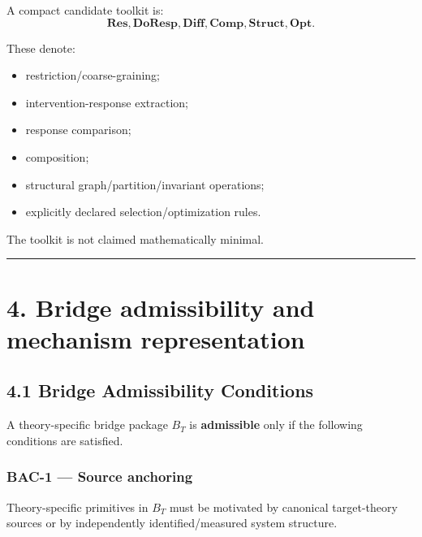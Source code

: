 \documentclass[
  11pt,
  a4paper,
]{article}
\providecommand{\tightlist}{%
  \setlength{\itemsep}{0pt}\setlength{\parskip}{0pt}}
\begin{document}
A compact candidate toolkit is:
\nopagebreak[4]
\[
\boxed{
\mathbf{Res},
\mathbf{DoResp},
\mathbf{Diff},
\mathbf{Comp},
\mathbf{Struct},
\mathbf{Opt}.
}
\]

These denote:

\begin{itemize}
\tightlist
\item
  restriction/coarse-graining;
\item
  intervention-response extraction;
\item
  response comparison;
\item
  composition;
\item
  structural graph/partition/invariant operations;
\item
  explicitly declared selection/optimization rules.
\end{itemize}

The toolkit is not claimed mathematically minimal.

\begin{center}\rule{0.5\linewidth}{0.5pt}\end{center}

\hypertarget{bridge-admissibility-and-mechanism-representation}{%
\section{4. Bridge admissibility and mechanism
representation}\label{bridge-admissibility-and-mechanism-representation}}

\hypertarget{bridge-admissibility-conditions}{%
\subsection{4.1 Bridge Admissibility
Conditions}\label{bridge-admissibility-conditions}}

A theory-specific bridge package \(B_T\) is \textbf{admissible} only if
the following conditions are satisfied.

\hypertarget{bac-1-source-anchoring}{%
\subsubsection{BAC-1 --- Source
anchoring}\label{bac-1-source-anchoring}}

Theory-specific primitives in \(B_T\) must be motivated by canonical
target-theory sources or by independently identified/measured system
structure.
\end{document}
